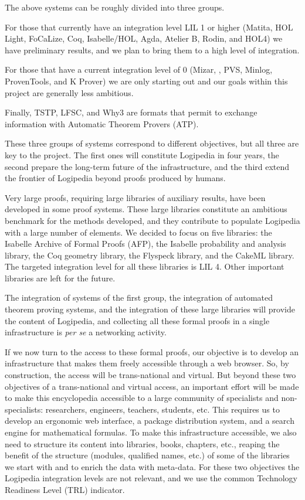 The above systems can be roughly divided into three groups.
\begin{compactitem}
\item For those
that currently have an integration level LIL 1 or higher (Matita, HOL
Light, FoCaLize, Coq, Isabelle/HOL, Agda, Atelier B, Rodin, and HOL4)
we have preliminary results, and we plan to bring them to a high level
of integration.
\item For those that have a current integration level of 0
(Mizar, \tlaplus, PVS, Minlog, ProvenTools, and K Prover) we are only
starting out and our goals within this project are generally less
ambitious.
\item Finally, TSTP, LFSC, and Why3 are formats that permit
to exchange information with Automatic Theorem Provers (ATP).
\end{compactitem}
These three groups of systems correspond to different
objectives, but all three are key to the project. The first ones will
constitute Logipedia in four years, the second prepare the
long-term future of the infrastructure, and the third extend the
frontier of Logipedia beyond proofs produced by humans.

Very large proofs, requiring large libraries of auxiliary results,
have been developed in some proof systems. These large libraries
constitute an ambitious benchmark for the methods developed, and they
contribute to populate Logipedia with a large number of elements.
We decided to focus on five libraries: the
Isabelle Archive of Formal Proofs (AFP), the Isabelle probability and
analysis library, the Coq geometry library, the Flyspeck library, and
the CakeML library. The targeted integration level for all these
libraries is LIL 4. Other important libraries are left for the future.

The integration of systems of the first group, the integration of
automated theorem proving systems, and the integration of these large
libraries will provide the content of Logipedia, and collecting all
these formal proofs in a single infrastructure is {\em per se} a
networking activity.

If we now turn to the access to these formal proofs, our objective is
to develop an infrastructure that makes them freely accessible through
a web browser. So, by construction, the access will be trans-national
and virtual. But beyond these two objectives of a trans-national and
virtual access, an important effort will be made to make this
encyclopedia accessible to a large community of specialists and
non-specialists: researchers, engineers, teachers, students, etc.
This requires us to develop an ergonomic web interface, a package
distribution system, and a search engine for mathematical formulas.
To make this infrastructure accessible, we also need to structure its
content into libraries, books, chapters, etc., reaping the benefit of
the structure (modules, qualified names, etc.) of some of the
libraries we start with and to enrich the data with meta-data.
For these two objectives the Logipedia integration levels are not
relevant, and we use the common Technology Readiness Level (TRL) indicator.

